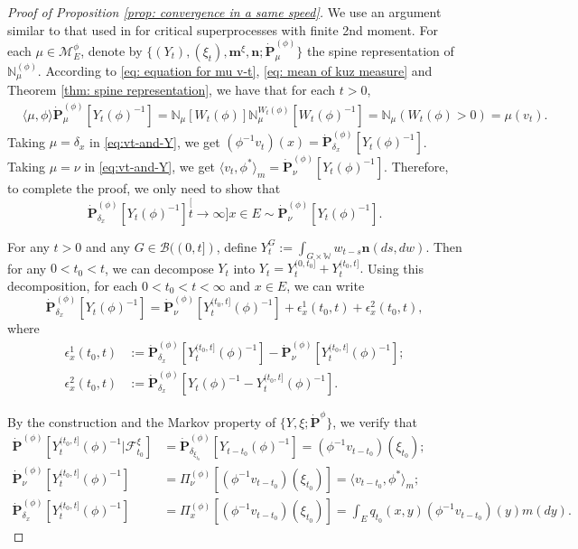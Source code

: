 \documentclass[12pt, a4paper]{amsart}
\theoremstyle{definition}
\numberwithin{equation}{section}
\begin{document}
\begin{proof}[Proof of Proposition \ref{prop: convergence in a same speed}]
	We use an argument similar to that used in \cite{RenSongSun2017Spine} for critical superprocesses with finite 2nd moment.
	For each $\mu\in\mathcal M^\phi_E$, denote by
	$\{(Y_t), (\xi_t),\mathbf m^\xi, \mathbf n; \dot {\mathbf P}^{(\phi)}_\mu\}$
	the spine representation of $\mathbb N^{(\phi)}_\mu$.
	According to \eqref	{eq: equation for mu v-t}, \eqref{eq: mean of kuz measure} and Theorem \ref{thm: spine representation},
	we have that for each $t>0$,
\[\begin{split}\label{eq:vt-and-Y}
	&\langle \mu,\phi \rangle \dot {\mathbf P}^{(\phi)}_\mu [Y_t(\phi)^{-1}]
	= \mathbb N_\mu[W_t(\phi)] \mathbb N^{W_t(\phi)}_\mu [W_t(\phi)^{-1}]
	= \mathbb N_\mu(W_t(\phi) > 0)
	= \mu(v_t).
\end{split}\]
	Taking $\mu = \delta_x$ in \eqref{eq:vt-and-Y}, we get $(\phi^{-1}v_t)(x) =\dot{\mathbf P}_{\delta_x}^{(\phi)}[Y_t(\phi)^{-1}]$.
	Taking $\mu = \nu$ in \eqref{eq:vt-and-Y}, we get $\langle v_t, \phi^*\rangle_m = \dot {\mathbf P}_{\nu}^{(\phi)} [Y_t(\phi)^{-1}]$.
	Therefore, to complete the proof,
	we only need to show that
\[
	\dot{\mathbf P}_{\delta_x}^{(\phi)}[Y_t(\phi)^{-1}]
	\stackrel[t\to \infty]{x\in E}{\sim}  \dot {\mathbf P}_\nu^{(\phi)} [Y_t(\phi)^{-1}].
\]

	For any $t>0$ and any $G\in \mathscr B((0,t])$, define
$
	Y^G_t
	:= \int_{G\times \mathbb W} w_{t-s} \mathbf n(ds,dw).
$
	Then for any $0 < t_0 < t$, we can decompose $Y_t$ into
$
	Y_t
	= Y^{(0,t_0]}_t + Y^{(t_0,t]}_t.
$
	Using this decomposition, for each $0<t_0<t<\infty$ and $x\in E$, we can write
\[\label{eq: starting point of phi-1v_t(x)}
	 \dot{\mathbf P}_{\delta_x}^{(\phi)}[Y_t(\phi)^{-1}]
	= \dot {\mathbf P}_\nu^{(\phi)} [Y^{(t_0,t]}_t(\phi)^{-1}] + \epsilon_x^1(t_0,t) +\epsilon_x^2(t_0,t),
\]
	where
\[\begin{split}
	\epsilon_x^1(t_0,t)
	&:= \dot {\mathbf P}_{\delta_x}^{(\phi)} [Y^{(t_0,t]}_t(\phi)^{-1}] - \dot {\mathbf P}_\nu^{(\phi)} [Y^{(t_0,t]}_t(\phi)^{-1}];
	\\\epsilon_x^2(t_0,t)
	&:= \dot{\mathbf P}_{\delta_x}^{(\phi)}[Y_t(\phi)^{-1} - Y^{(t_0,t]}_t(\phi)^{-1}].
\end{split}\]

	By the construction and the Markov property of $\{Y,\xi; \dot {\mathbf P}^{\phi}\}$,
	we verify that
\[\label{eq: some equations for PY-1}\begin{split}
	\dot{\mathbf P}^{(\phi)} [Y_t^{(t_0,t]}(\phi)^{-1}|\mathscr F^\xi_{t_0}]
	&= \dot{\mathbf P}_{\delta_{\xi_{t_0}}}^{(\phi)}  [Y_{t-t_0}(\phi)^{-1}]
	= (\phi^{-1}v_{t-t_0})(\xi_{t_0});
	\\ \dot{\mathbf P}_\nu^{(\phi)}[Y_t^{(t_0,t]}(\phi)^{-1}]
	&= \Pi_{\nu}^{(\phi)}[(\phi^{-1}v_{t-t_0})(\xi_{t_0}) ]
	= \langle v_{t-t_0},\phi^* \rangle_m;
	\\ \dot{\mathbf P}_{\delta_x}^{(\phi)}[Y_t^{(t_0,t]}(\phi)^{-1}]
	&= \Pi_x^{(\phi)}[(\phi^{-1}v_{t-t_0})(\xi_{t_0}) ]
	=  \int_E  q_{t_0}(x,y)(\phi^{-1}v_{t-t_0})(y) m(dy).
\end{split}\]


\end{proof}
\end{document}
